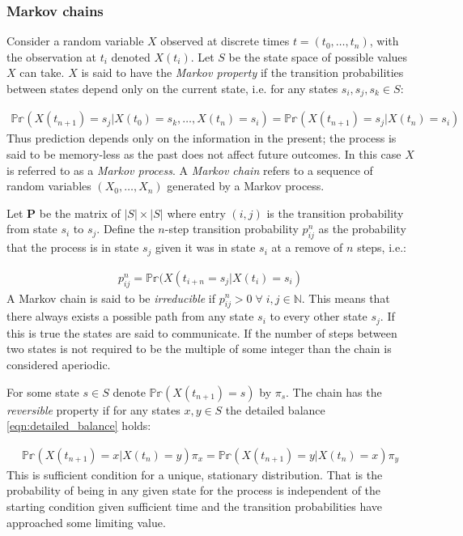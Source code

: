 \documentclass[12pt]{article} %
\begin{document}
\subsubsection{Markov chains}
Consider a random variable $X$ observed at discrete times $t = (t_0,\ldots,t_n)$, with the observation at $t_i$ denoted $X(t_i)$. Let $S$ be the state space of possible values $X$ can take. $X$ is said to have the \emph{Markov property} if the transition probabilities between states depend only on the current state, i.e. for any states $s_i, s_j, s_k \in S$:

\begin{align}
\mathbb{Pr}(X(t_{n+1}) = s_j | X(t_0) = s_k, \ldots, X(t_n) = s_i) = \mathbb{Pr}(X(t_{n+1}) = s_j | X(t_n) = s_i) 
\end{align}
Thus prediction depends only on the information in the present; the process is said to be memory-less as the past does not affect future outcomes. In this case  $X$ is referred to as a \emph{Markov process}. A \emph{Markov chain} refers to a sequence of random variables $(X_0,\ldots,X_n)$ generated by a Markov process.

Let $\mathbf{P}$ be the matrix of $|S| \times |S|$ where entry $(i,j)$ is the transition probability from state $s_i$ to $s_j$. Define the $n$-step transition probability $p_{ij}^n$ as the probability that the process is in state $s_j$ given it was in state $s_i$ at a remove of $n$ steps, i.e.:

\begin{align}
p_{ij}^n = \mathbb{Pr}(X(t_{i+n} = s_j | X(t_i) = s_i)
\end{align}
A Markov chain is said to be \emph{irreducible} if $p_{ij}^n > 0 \; \forall \; i,j \in \mathbb{N}$. This means that there always exists a possible path from any state $s_i$ to every other state $s_j$. If this is true the states are said to communicate. If the number of steps between two states is not required to be the multiple of some integer than the chain is considered aperiodic.

For some state $s \in S$ denote $ \mathbb{Pr}(X(t_{n+1}) = s)$ by $\pi_s$. The chain has the \emph{reversible} property if for any states $x, y \in S$ the detailed balance \eqref{eqn:detailed_balance} holds:

\begin{align} \label{eqn:detailed_balance}
\mathbb{Pr}(X(t_{n+1}) = x | X(t_n) = y)  \pi_x  =  \mathbb{Pr}(X(t_{n+1}) = y | X(t_n) = x) \pi_y
\end{align}
This is sufficient condition for a unique, stationary distribution. That is the probability of being in any given state for the process is independent of the starting condition given sufficient time and the transition probabilities have approached some limiting value. 
\end{document}
